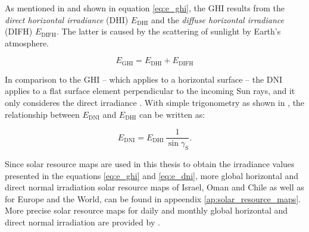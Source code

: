 As mentioned in \cite{Mertens:2015, SolarRadiationModeling:2020} and shown in equation \ref{eq:e_ghi}, the GHI results from the \emph{direct horizontal irradiance} (DHI) $E_{\mathrm{DHI}}$ and the \emph{diffuse horizontal irradiance} (DIFH) $E_{\mathrm{DIFH}}$. The latter is caused by the scattering of sunlight by Earth's atmosphere.

\begin{center}
	\begin{equation} \label{eq:e_ghi}
		E_{\mathrm{GHI}} = E_{\mathrm{DHI}} + E_{\mathrm{DIFH}}
	\end{equation}
\end{center}

In comparison to the GHI -- which applies to a horizontal surface -- the DNI applies to a flat surface element perpendicular to the incoming Sun rays, and it only consideres the direct irradiance \cite{Mertens:2015, SolarRadiationModeling:2020}. With simple trigonometry as shown in \cite{Mertens:2015}, the relationship between $E_{\mathrm{DNI}}$ and $E_{\mathrm{DHI}}$ can be written as:

\begin{center}
	\begin{equation} \label{eq:e_dni}
		E_{\mathrm{DNI}} = E_{\mathrm{DHI}} \, \frac{1}{\sin \gamma_{\mathrm{S}}} \text{.}
	\end{equation}
\end{center}

Since solar resource maps are used in this thesis to obtain the irradiance values presented in the equations \ref{eq:e_ghi} and \ref{eq:e_dni}, more global horizontal and direct normal irradiation solar resource maps of Israel, Oman and Chile as well as for Europe and the World, can be found in appeendix \ref{ap:solar_resource_maps}. More precise solar resource maps for daily and monthly global horizontal and direct normal irradiation are provided by \cite{Union:2020}.

%
%
%


